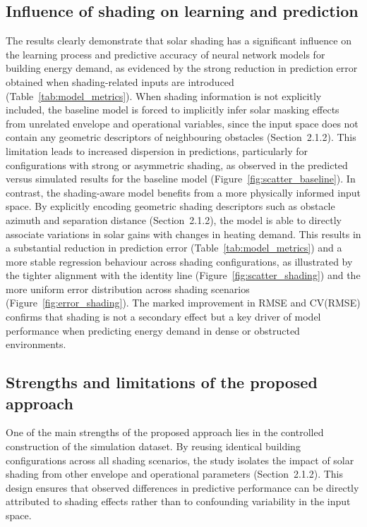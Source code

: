 \documentclass{article}
\begin{document}
\subsection{Influence of shading on learning and prediction}
The results clearly demonstrate that solar shading has a significant influence on the learning process and predictive accuracy of neural network models for building energy demand, as evidenced by the strong reduction in prediction error obtained when shading-related inputs are introduced (Table~\ref{tab:model_metrics}). When shading information is not explicitly included, the baseline model is forced to implicitly infer solar masking effects from unrelated envelope and operational variables, since the input space does not contain any geometric descriptors of
neighbouring obstacles (Section~2.1.2). This limitation leads to increased dispersion in predictions, particularly for configurations with strong or asymmetric shading, as observed in the predicted versus simulated results for the baseline model (Figure~\ref{fig:scatter_baseline}).
In contrast, the shading-aware model benefits from a more physically informed input space. By explicitly encoding geometric shading descriptors such as obstacle azimuth and separation distance (Section~2.1.2), the model is able to directly associate variations in solar gains with changes in heating demand. This results in a substantial reduction in prediction error (Table~\ref{tab:model_metrics}) and a more stable regression behaviour across shading configurations, as illustrated by the tighter alignment with the identity line (Figure~\ref{fig:scatter_shading}) and the more uniform error distribution across shading scenarios (Figure~\ref{fig:error_shading}). The marked improvement in RMSE and CV(RMSE) confirms that shading is not a secondary effect but a key driver of model performance when predicting energy demand in dense or obstructed environments.
\subsection{Strengths and limitations of the proposed approach}
One of the main strengths of the proposed approach lies in the controlled
construction of the simulation dataset. By reusing identical building
configurations across all shading scenarios, the study isolates the impact of
solar shading from other envelope and operational parameters
(Section~2.1.2). This design ensures that observed differences in predictive
performance can be directly attributed to shading effects rather than to
confounding variability in the input space.
\end{document}
